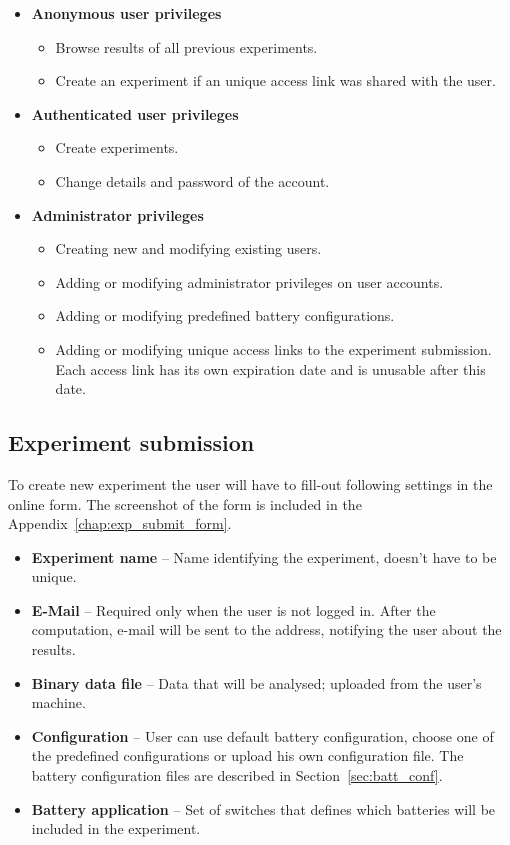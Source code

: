 \documentclass[
	digital,    %
	oneside,
	color,
	11pt,
	nocover,
	notable,
	nolof,
	nolot,
]{fithesis3}
\theoremstyle{definition}
\theoremstyle{remark}
\begin{document}
\begin{itemize}
\item \textbf{Anonymous user privileges}
\begin{itemize}
\item Browse results of all previous experiments.
\item Create an experiment if an unique access link was shared with the user.
\end{itemize}
\pagebreak
\item \textbf{Authenticated user privileges}
\begin{itemize}
\item Create experiments.
\item Change details and password of the account.
\end{itemize}
\item \textbf{Administrator privileges}
\begin{itemize}
\item Creating new and modifying existing users.
\item Adding or modifying administrator privileges on user accounts.
\item Adding or modifying predefined battery configurations.
\item Adding or modifying unique access links to the experiment submission. Each access link has its own expiration date and is unusable after this date.
\end{itemize}
\end{itemize}

\subsection*{Experiment submission}
To create new experiment the user will have to fill-out following settings in the online form. The screenshot of the form is included in the Appendix~\ref{chap:exp_submit_form}.

\begin{itemize}
\item \textbf{Experiment name} -- Name identifying the experiment, doesn't have to be unique.
\item \textbf{E-Mail} -- Required only when the user is not logged in. After the computation, e-mail will be sent to the address, notifying the user about the results.
\item \textbf{Binary data file} -- Data that will be analysed; uploaded from the user's machine.
\item \textbf{Configuration} -- User can use default battery configuration, choose one of the predefined configurations or upload his own configuration file. The battery configuration files are described in Section~\ref{sec:batt_conf}.
\item \textbf{Battery application} -- Set of switches that defines which batteries will be included in the experiment.
\end{itemize}
\end{document}
